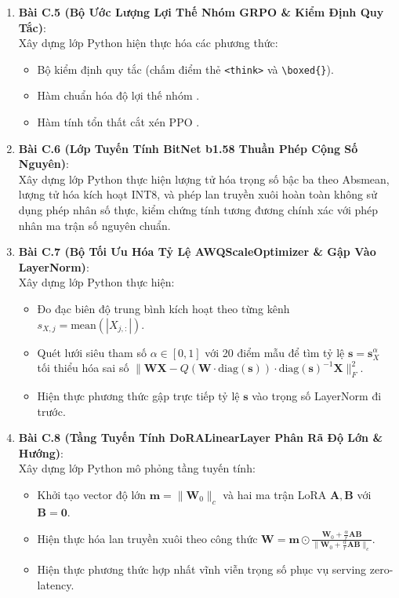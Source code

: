 \begin{enumerate}
  \item \textbf{Bài C.5 (Bộ Ước Lượng Lợi Thế Nhóm GRPO \& Kiểm Định Quy Tắc)}: \\
  Xây dựng lớp Python  hiện thực hóa các phương thức:
  \begin{itemize}
    \item Bộ kiểm định quy tắc  (chấm điểm thẻ \verb|<think>| và \verb|\boxed{}|).
    \item Hàm chuẩn hóa độ lợi thế nhóm .
    \item Hàm tính tổn thất cắt xén PPO .
  \end{itemize}

  \item \textbf{Bài C.6 (Lớp Tuyến Tính BitNet b1.58 Thuần Phép Cộng Số Nguyên)}: \\
  Xây dựng lớp Python  thực hiện lượng tử hóa trọng số bậc ba theo Absmean, lượng tử hóa kích hoạt INT8, và phép lan truyền xuôi  hoàn toàn không sử dụng phép nhân số thực, kiểm chứng tính tương đương chính xác với phép nhân ma trận số nguyên chuẩn.

  \item \textbf{Bài C.7 (Bộ Tối Ưu Hóa Tỷ Lệ AWQScaleOptimizer \& Gập Vào LayerNorm)}: \\
  Xây dựng lớp Python  thực hiện:
  \begin{itemize}
    \item Đo đạc biên độ trung bình kích hoạt theo từng kênh $s_{X, j} = \text{mean}(|X_{j, :}|)$.
    \item Quét lưới siêu tham số $\alpha \in [0, 1]$ với 20 điểm mẫu để tìm tỷ lệ $\mathbf{s} = \mathbf{s}_X^\alpha$ tối thiểu hóa sai số $\|\mathbf{W}\mathbf{X} - Q(\mathbf{W} \cdot \text{diag}(\mathbf{s})) \cdot \text{diag}(\mathbf{s})^{-1}\mathbf{X}\|_F^2$.
    \item Hiện thực phương thức  gập trực tiếp tỷ lệ $\mathbf{s}$ vào trọng số LayerNorm đi trước.
  \end{itemize}

  \item \textbf{Bài C.8 (Tầng Tuyến Tính DoRALinearLayer Phân Rã Độ Lớn \& Hướng)}: \\
  Xây dựng lớp Python  mô phỏng tầng tuyến tính:
  \begin{itemize}
    \item Khởi tạo vector độ lớn $\mathbf{m} = \|\mathbf{W}_0\|_c$ và hai ma trận LoRA $\mathbf{A}, \mathbf{B}$ với $\mathbf{B} = \mathbf{0}$.
    \item Hiện thực hóa lan truyền xuôi theo công thức $\mathbf{W} = \mathbf{m} \odot \frac{\mathbf{W}_0 + \frac{\alpha}{r}\mathbf{A}\mathbf{B}}{\|\mathbf{W}_0 + \frac{\alpha}{r}\mathbf{A}\mathbf{B}\|_c}$.
    \item Hiện thực phương thức  hợp nhất vĩnh viễn trọng số phục vụ serving zero-latency.
  \end{itemize}


\end{enumerate}

